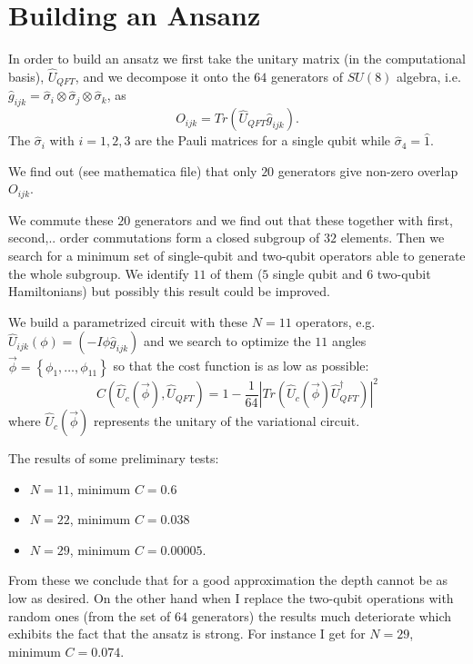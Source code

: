 \documentclass[inscr,ack,preface]{diphdthesis}
\begin{document}
\section{Building an Ansanz} 

In order to build an ansatz we first take the unitary matrix (in the computational basis), $\hat{U}_{QFT}$,
and we decompose it onto the $64$ generators of $SU(8)$ algebra, i.e. $\hat{g}_{ijk}=\hat{\sigma}_{i} \otimes \hat{\sigma}_{j} \otimes \hat{\sigma}_{k}$,
as 
\begin{equation}
O_{ijk}=Tr\left(\hat{U}_{QFT} \hat{g}_{ijk} \right).
\end{equation}
The $\hat{\sigma}_{i}$ with $i=1,2,3$ are the Pauli matrices for a single qubit while $\hat{\sigma}_{4}=\hat{1}$.

We find out (see mathematica file) that only $20$ generators give non-zero overlap $O_{ijk}$.

We commute these $20$ generators and we find out that these together with first, second,.. order commutations form
a closed subgroup of $32$ elements. Then we search for a minimum set of single-qubit and two-qubit operators able to generate the whole
subgroup. We identify $11$ of them ($5$ single qubit and $6$ two-qubit Hamiltonians) but possibly this result could be improved.

We build a parametrized circuit with these $N=11$ operators, e.g. $\hat{U}_{ijk}\left(\phi\right)=\left(-I \phi \hat{g}_{ijk}\right)$ and we search to optimize the $11$ angles $\vec{\phi}=\left\{\phi_1,\ldots, \phi_{11}\right\}$ so that the cost function is as low as possible:
\begin{equation}
C\left(\hat{U}_c\left(\vec{\phi}\right), \hat{U}_{QFT}\right)=1-\frac{1}{64}\left|Tr\left(\hat{U}_c\left(\vec{\phi}\right)\hat{U}_{QFT}^{\dagger} \right)\right|^2
\end{equation}
where $\hat{U}_c\left(\vec{\phi}\right)$ represents the unitary of the variational circuit.

The results of some preliminary tests:
\begin{itemize}
	\item $N=11$, minimum $C=0.6$
	\item $N=22$, minimum $C=0.038$
	\item $N=29$, minimum $C=0.00005$.
\end{itemize}
From these we conclude that for a good approximation the depth cannot be as low as desired.
On the other hand when I replace the two-qubit operations with random ones (from the set of $64$ generators) the 
results much deteriorate which exhibits the fact that the ansatz is strong. For instance I get for $N=29$, minimum $C=0.074$.
\end{document}

